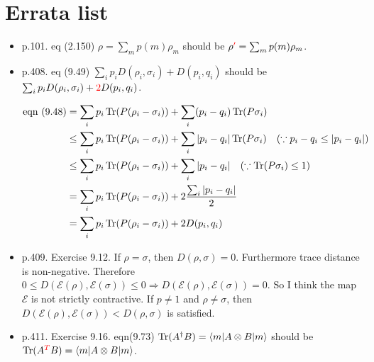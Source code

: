 \chapter{Errata list}\label{errata}

\begin{itemize}
    \item p.101. eq (2.150) $\rho = \sum_m p(m) \rho_m$ should be $\rho \textcolor{red}{'} = \sum_m p(m) \rho_m$.
%
    \item p.408. eq (9.49) $\sum_i p_i D(\rho_i, \sigma_i) + D(p_i, q_i)$ should be $\sum_i p_i D(\rho_i, \sigma_i) + \textcolor[rgb]{1,0,0}{2}D(p_i, q_i)$.

    \begin{align*}
    \text{eqn } (9.48) 
        &= \sum_i p_i \operatorname{Tr} (P(\rho_i - \sigma_i)) + \sum_i (p_i - q_i) \operatorname{Tr} (P \sigma_i)\\
        &\leq \sum_i p_i \operatorname{Tr} (P(\rho_i - \sigma_i)) + \sum_i |p_i - q_i| \operatorname{Tr} (P \sigma_i)~~~(\because p_i - q_i \leq |p_i - q_i|)\\
        &\leq \sum_i p_i \operatorname{Tr} (P(\rho_i - \sigma_i)) + \sum_i |p_i - q_i|~~~(\because \operatorname{Tr} (P \sigma_i) \leq 1)\\
        &= \sum_i p_i \operatorname{Tr} (P(\rho_i - \sigma_i)) + 2 \frac{\sum_i |p_i - q_i|}{2}\\
        &= \sum_i p_i \operatorname{Tr} (P(\rho_i - \sigma_i)) + 2D(p_i, q_i)
    \end{align*}
%
    \item p.409. Exercise 9.12. If $\rho = \sigma$, then $D(\rho, \sigma) = 0$. Furthermore trace distance is non-negative. Therefore $0 \leq D(\mathcal{E}(\rho), \mathcal{E}(\sigma)) \leq 0 \Rightarrow D(\mathcal{E}(\rho), \mathcal{E}(\sigma))  = 0$. So I think the map $\mathcal{E}$ is not strictly contractive. If $p \neq 1$ and $\rho \neq \sigma$, then $D(\mathcal{E}(\rho), \mathcal{E}(\sigma)) < D(\rho, \sigma)$ is satisfied.
%
    \item p.411. Exercise 9.16. eqn(9.73) $\operatorname{Tr} (A^\dagger B) = \braket{m | A \otimes B | m}$ should be $\operatorname{Tr} (A^{\textcolor{red}{T}} B) = \braket{m | A \otimes B | m}$.


\end{itemize}
